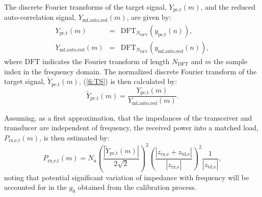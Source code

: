 \documentclass[preprint,12pt,TurnOnLineNumbers]{JASAnew}
\newcommand{\samplesymt}{n}
\newcommand{\samplesymf}{m}
\newcommand{\nchannels}{N_{\textrm{u}}}
\newcommand{\zrxe}{z_{\textrm{rx,e}}}
\newcommand{\ztde}{z_{\textrm{td,e}}}
\newcommand{\ypctarget}{y_{\textrm{pc,t}}}
\newcommand{\ymfautored}{y_{\textrm{mf,auto,red}}}
\newcommand{\ypctargetf}{Y_{\textrm{pc,t}}}
\newcommand{\ypctargetnormf}{\tilde{Y}_{\textrm{pc,t}}}
\newcommand{\ymfautoredf}{Y_{\textrm{mf,auto,red}}}
\newcommand{\prxetf}{P_{\textrm{rx,e,t}}}
\newcommand{\gainzero}{g_0}
\newcommand{\dft}{\textrm{DFT}}
\newcommand{\ndft}{{N_{\textrm{DFT}}}}
\begin{document}
The discrete Fourier transforms of the target signal, $\ypctargetf(\samplesymf)$, and the reduced auto-correlation signal, $\ymfautoredf(\samplesymf)$, are given by:
\begin{eqnarray}
\label{eq:DFT_Target_Auto}
\ypctargetf(\samplesymf) & = & \dft_\ndft(\ypctarget(\samplesymt)),\\
\ymfautoredf(\samplesymf) & = & \dft_\ndft(\ymfautored(\samplesymt)),
\end{eqnarray}
where $\dft$ indicates the Fourier transform of length $\ndft$ and $\samplesymf$ the sample index in the frequency domain.
The normalized discrete Fourier transform of the target signal, $\ypctargetnormf(\samplesymf)$, (\autoref{fi:TS}) is then calculated by: 
%
\begin{equation}
\label{eq:DFT_Target_Auto_Norm}
\ypctargetnormf(\samplesymf) = \frac{\ypctargetf(\samplesymf)} {\ymfautoredf(\samplesymf)}.
\end{equation}

Assuming, as a first approximation, that the impedances of the transceiver and transducer are independent of frequency, the received power into a matched load, $\prxetf(\samplesymf)$, is then estimated by:
\begin{equation}
\label{eq:prx_FFT_target}
\prxetf(\samplesymf) = \nchannels\left( \frac{|\ypctargetnormf(\samplesymf)|}{2\sqrt{2}} \right)^2 
\left( \frac{|\zrxe+\ztde|}{|\zrxe|}\right)^2 \frac{1}{|\ztde|}, %
\end{equation}
%
noting that potential significant variation of impedance with frequency will be accounted for in the $\gainzero$ obtained from the calibration process.
\end{document}
